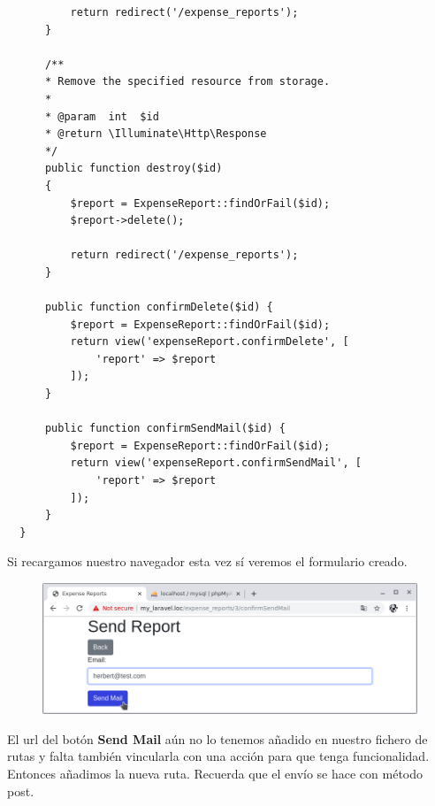 \documentclass{article}
\begin{document}
\begin{verbatim}
          return redirect('/expense_reports');
      }

      /**
      * Remove the specified resource from storage.
      *
      * @param  int  $id
      * @return \Illuminate\Http\Response
      */
      public function destroy($id)
      {
          $report = ExpenseReport::findOrFail($id);
          $report->delete();

          return redirect('/expense_reports');
      }

      public function confirmDelete($id) {
          $report = ExpenseReport::findOrFail($id);
          return view('expenseReport.confirmDelete', [
              'report' => $report
          ]);
      }

      public function confirmSendMail($id) {
          $report = ExpenseReport::findOrFail($id);
          return view('expenseReport.confirmSendMail', [
              'report' => $report
          ]);
      }
  }
\end{verbatim}

Si recargamos nuestro navegador esta vez sí veremos el formulario creado.

\begin{figure}[h!]
  \centering
  \includegraphics[scale=0.5]{./Pictures/122_send_mail_form.png}
\end{figure}

El url del botón \textbf{Send Mail} aún no lo tenemos añadido en nuestro
fichero de rutas y falta también vincularla con una acción para que tenga
funcionalidad. Entonces añadimos la nueva ruta. Recuerda que el envío se hace
con método post.\\
\end{document}
